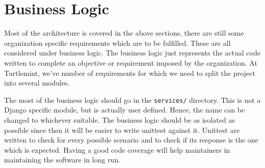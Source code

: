 \section{Business Logic}
Most of the architecture is covered in the above sections, there are still
some organization specific requirements which are to be fulfilled. These are
all considered under business logic. The business logic just represents the
actual code written to complete an objective or requirement imposed by the
organization. At Turtlemint, we've number of requirements for which we need
to split the project into several modules.

The most of the business logic should go in the \texttt{services/} directory.
This is not a Django specific module, but is actually user defined. Hence, the
name can be changed to whichever suitable. The business logic should be as
isolated as possible since then it will be easier to write unittest against
it. Unittest are written to check for every possible scenario and to check if
its response is the one which is expected. Having a good code coverage will
help maintainers in maintaining the software in long run.

